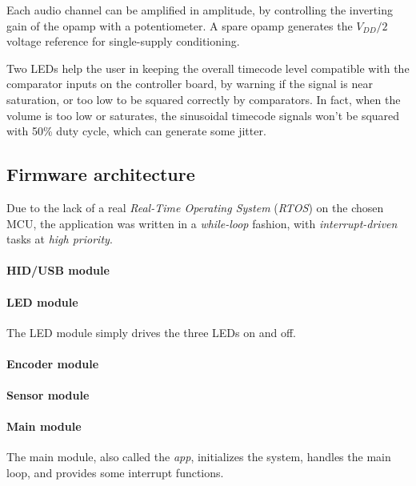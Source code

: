 \documentclass[a4paper,10pt]{article}
\begin{document}
\begin{multicols}{2}
Each audio channel can be amplified in amplitude, by controlling the inverting
gain of the opamp with a potentiometer. A spare opamp generates the $V_{DD}/2$
voltage reference for single-supply conditioning.

Two LEDs help the user in keeping the overall timecode level compatible with
the comparator inputs on the controller board, by warning if the signal is
near saturation, or too low to be squared correctly by comparators.
In fact, when the volume is too low or saturates, the sinusoidal timecode
signals won't be squared with 50\% duty cycle, which can generate some jitter.

\INSFIG


\subsection{Firmware architecture}

Due to the lack of a real \emph{Real-Time Operating System} (\emph{RTOS}) on
the chosen MCU, the application was written in a \emph{while-loop} fashion,
with \emph{interrupt-driven} tasks at \emph{high priority}.

\TODO


\paragraph{HID/USB module}
\TODO


\paragraph{LED module}
The LED module simply drives the three LEDs on and off.


\paragraph{Encoder module}
\TODO


\paragraph{Sensor module}
\TODO


\paragraph{Main module}
The main module, also called the \emph{app}, initializes the system, handles
the main loop, and provides some interrupt functions.


\end{multicols}
\end{document}
